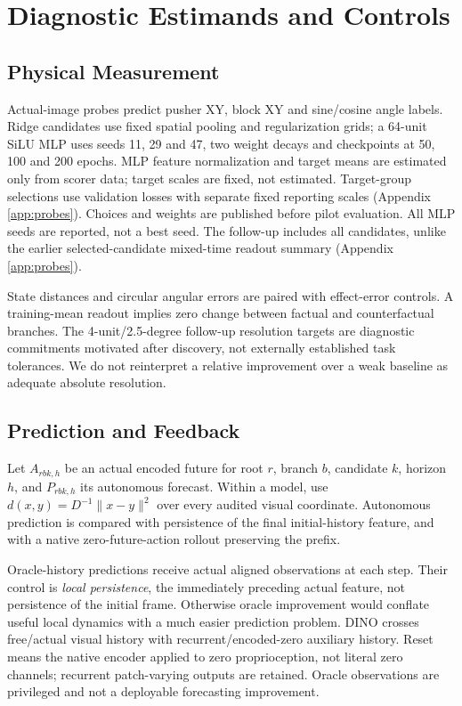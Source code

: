 \section{Diagnostic Estimands and Controls}
\label{sec:estimands}

\subsection{Physical Measurement}
\label{sec:measurementmethods}
Actual-image probes predict pusher XY, block XY and sine/cosine angle labels.
Ridge candidates use fixed spatial pooling and regularization grids; a 64-unit
SiLU MLP uses seeds 11, 29 and 47, two weight decays and checkpoints at 50,
100 and 200 epochs. MLP feature normalization and target means are estimated
only from scorer data; target scales are fixed, not estimated. Target-group
selections use validation losses with separate fixed reporting scales (Appendix
\ref{app:probes}). Choices and weights are
published before pilot evaluation. All MLP seeds are reported, not a best seed.
The follow-up includes all candidates, unlike the earlier selected-candidate
mixed-time readout summary (Appendix \ref{app:probes}).

State distances and circular angular errors are paired with effect-error
controls. A training-mean readout implies zero change between factual and
counterfactual branches. The 4-unit/2.5-degree follow-up resolution targets are
diagnostic commitments motivated after discovery, not externally established
task tolerances. We do not reinterpret a relative improvement over a weak
baseline as adequate absolute resolution.

\subsection{Prediction and Feedback}
Let $A_{rbk,h}$ be an actual encoded future for root $r$, branch $b$, candidate
$k$, horizon $h$, and $P_{rbk,h}$ its autonomous forecast. Within a model, use
$d(x,y)=D^{-1}\lVert x-y\rVert^2$ over every audited visual coordinate.
Autonomous prediction is compared with persistence of the final initial-history
feature, and with a native zero-future-action rollout preserving the prefix.

Oracle-history predictions receive actual aligned observations at each step.
Their control is \emph{local persistence}, the immediately preceding actual
feature, not persistence of the initial frame. Otherwise oracle improvement
would conflate useful local dynamics with a much easier prediction problem.
DINO crosses free/actual visual history with recurrent/encoded-zero auxiliary
history. Reset means the native encoder applied to zero proprioception, not
literal zero channels; recurrent patch-varying outputs are retained. Oracle
observations are privileged and not a deployable forecasting improvement.

